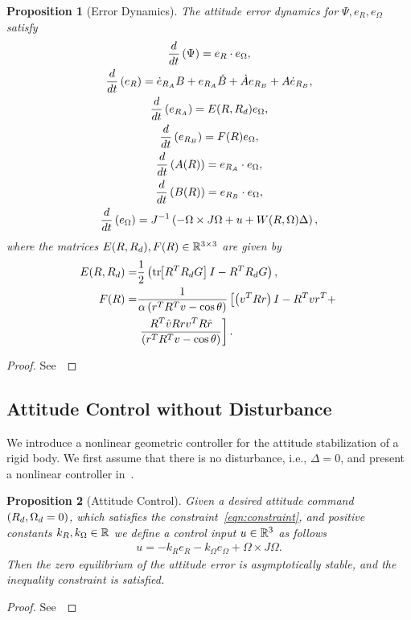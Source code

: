 \documentclass[10pt,fleqn]{IJCAS}  %
\newtheorem{prop}{Proposition}
\begin{document}
\begin{multicols}{2}
\begin{prop}[Error Dynamics]\label{prop:error_dyn}
	The attitude error dynamics for \( \Psi, e_R, e_\Omega \) satisfy 
	\begin{gather}
		\frac{d }{d t} \left( \Psi \right) = e_R \cdot e_\Omega , \label{eqn:psi_dot}\\
		\frac{d }{d t} \left( e_R \right) = \dot{e}_{R_A} B + e_{R_A} \dot{B} + \dot{A}e_{R_B} + A \dot{e}_{R_B} , \label{eqn:eR_dot} \\
		\frac{d }{d t} \left( e_{R_A} \right) = E(R, R_d) e_\Omega , \label{eqn:eRA_dot} \\
		\frac{d }{d t} \left( e_{R_B} \right) = F(R) e_\Omega , \label{eqn:eRB_dot} \\
    	\frac{d }{d t} \left( A(R) \right) = e_{R_A} \cdot e_\Omega , \label{eqn:A_dot} \\
		\frac{d }{d t} \left( B(R) \right) = e_{R_B} \cdot e_\Omega , \label{eqn:B_dot} \\
		\frac{d }{d t} \left( e_\Omega \right) = J^{-1} \left( -\Omega \times J \Omega + u + W(R, \Omega) \Delta \right) , \label{eqn:eW_dot}
	\end{gather}
	where the matrices \(E(R,R_d), F(R) \in \mathbb{R}^{3\times3} \) are given by
	\begin{align}
		E(R,R_d) = &\frac{1}{2} \left( \mathrm{tr}\negthickspace\left[ R^T R_d G \right]I - R^T R_d G \right) , \label{eqn:E} \\
		F(R) = &\frac{1}{\alpha \left( r^T R^T v - \cos \theta \right)} \left[\left( v^T R r \right) I - R^T v r^T + \right. \nonumber \\
		& \left. \frac{R^T \hat{v} R r v^T R \hat{r}}{\left( r^T R^T v - \cos \theta \right)}\right] . \label{eqn:F}
	\end{align}
\end{prop}
\begin{proof}
See~
\end{proof}

\subsection{Attitude Control without Disturbance}
We introduce a nonlinear geometric controller for the attitude stabilization of a rigid body.
We first assume that there is no disturbance, i.e., \( \Delta = 0 \), and present a nonlinear controller in~.
\begin{prop}[Attitude Control]\label{prop:att_control}
	Given a desired attitude command \( \left( R_d, \Omega_d = 0 \right) \), which satisfies the constraint~\cref{eqn:constraint}, and positive constants \( k_R, k_\Omega \in \mathbb{R} \) we define a control input \( u \in \mathbb{R}^3 \) as follows
	\begin{gather}
		u = -k_R e_R - k_\Omega e_\Omega + \Omega \times J \Omega . \label{eqn:nodist_control}
	\end{gather}
	Then the zero equilibrium of the attitude error is asymptotically stable, and the inequality constraint is satisfied.
\end{prop}
\begin{proof}
See~
\end{proof}


\end{multicols}
\end{document}
